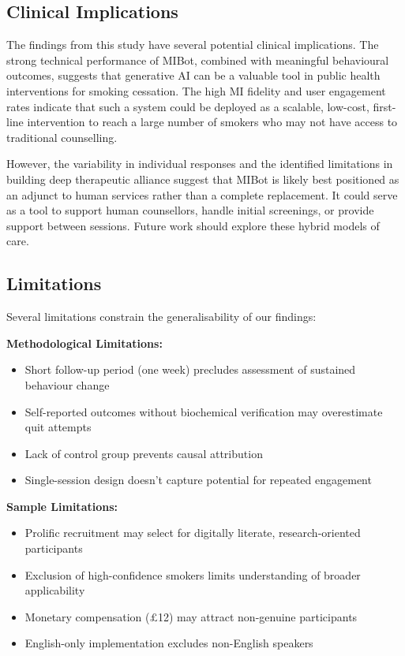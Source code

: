 \subsection{Clinical Implications}

The findings from this study have several potential clinical implications. The strong technical performance of MIBot, combined with meaningful behavioural outcomes, suggests that generative AI can be a valuable tool in public health interventions for smoking cessation. The high MI fidelity and user engagement rates indicate that such a system could be deployed as a scalable, low-cost, first-line intervention to reach a large number of smokers who may not have access to traditional counselling.

However, the variability in individual responses and the identified limitations in building deep therapeutic alliance suggest that MIBot is likely best positioned as an adjunct to human services rather than a complete replacement. It could serve as a tool to support human counsellors, handle initial screenings, or provide support between sessions. Future work should explore these hybrid models of care.

\subsection{Limitations}

Several limitations constrain the generalisability of our findings:

\textbf{Methodological Limitations:}
\begin{itemize}
\item Short follow-up period (one week) precludes assessment of sustained behaviour change
\item Self-reported outcomes without biochemical verification may overestimate quit attempts
\item Lack of control group prevents causal attribution
\item Single-session design doesn't capture potential for repeated engagement
\end{itemize}

\textbf{Sample Limitations:}
\begin{itemize}
\item Prolific recruitment may select for digitally literate, research-oriented participants
\item Exclusion of high-confidence smokers limits understanding of broader applicability
\item Monetary compensation ($\pounds$12) may attract non-genuine participants
\item English-only implementation excludes non-English speakers
\end{itemize}

